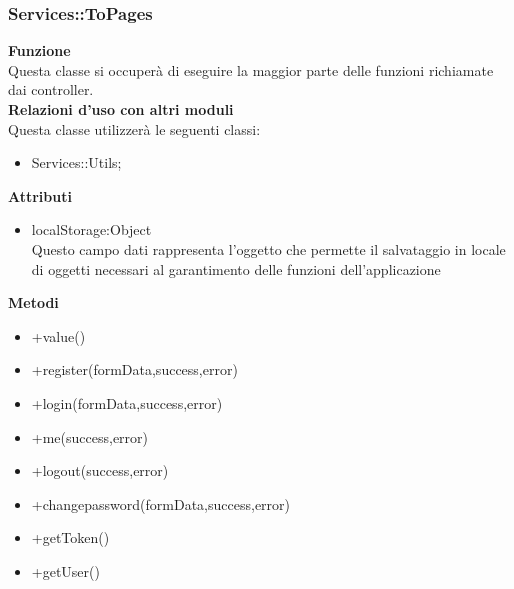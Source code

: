 \subsubsection{Services::ToPages}
		\label{sub:servicesMain}
		\textbf{Funzione}\\
		\indent Questa classe si occuperà di eseguire la maggior parte delle funzioni richiamate dai controller.\\
		\textbf{Relazioni d'uso con altri moduli}\\
		\indent Questa classe utilizzerà le seguenti classi:
		\begin{itemize}
		\item Services::Utils;
		\end{itemize}
		\textbf{Attributi}\\
		\begin{itemize}
		\item localStorage:Object\\
		Questo campo dati rappresenta l’oggetto che permette il salvataggio in locale di oggetti necessari al garantimento delle funzioni dell'applicazione
		\end{itemize}
		\textbf{Metodi}
		\begin{itemize}
		\item +value()
		\item +register(formData,success,error)
		\item +login(formData,success,error)
		\item +me(success,error)
		\item +logout(success,error)
		\item +changepassword(formData,success,error)
		\item +getToken()
		\item +getUser()

		\end{itemize} 


